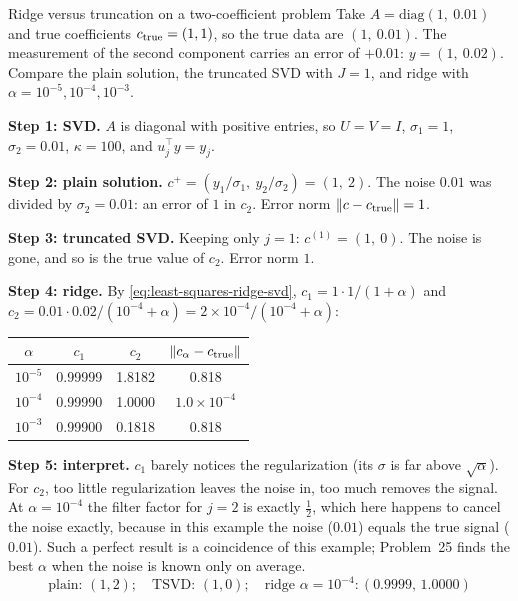 \begin{sample}{Ridge versus truncation on a two-coefficient problem}
Take $A = \mathrm{diag}(1,\ 0.01)$ and true coefficients $c_{\rm true} = (1,1)$, so the true data are $(1,\ 0.01)$. The measurement of the second component carries an error of $+0.01$: $y = (1,\ 0.02)$. Compare the plain solution, the truncated SVD with $J = 1$, and ridge with $\alpha = 10^{-5}, 10^{-4}, 10^{-3}$.

\textbf{Step 1: SVD.} $A$ is diagonal with positive entries, so $U = V = I$, $\sigma_1 = 1$, $\sigma_2 = 0.01$, $\kappa = 100$, and $u_j^\top y = y_j$.

\textbf{Step 2: plain solution.} $c^+ = (y_1/\sigma_1,\ y_2/\sigma_2) = (1,\ 2)$. The noise $0.01$ was divided by $\sigma_2 = 0.01$: an error of $1$ in $c_2$. Error norm $\left\lVert c - c_{\rm true}\right\rVert = 1$.

\textbf{Step 3: truncated SVD.} Keeping only $j=1$: $c^{(1)} = (1,\ 0)$. The noise is gone, and so is the true value of $c_2$. Error norm $1$.

\textbf{Step 4: ridge.} By \cref{eq:least-squares-ridge-svd}, $c_1 = 1\cdot1/(1+\alpha)$ and $c_2 = 0.01\cdot0.02/(10^{-4}+\alpha) = 2\times10^{-4}/(10^{-4}+\alpha)$:

\begin{center}
\begin{tabular}{cccc}\toprule
$\alpha$ & $c_1$ & $c_2$ & $\left\lVert c_\alpha - c_{\rm true}\right\rVert$\\\midrule
$10^{-5}$ & 0.99999 & 1.8182 & 0.818\\
$10^{-4}$ & 0.99990 & 1.0000 & $1.0\times10^{-4}$\\
$10^{-3}$ & 0.99900 & 0.1818 & 0.818\\\bottomrule
\end{tabular}
\end{center}

\textbf{Step 5: interpret.} $c_1$ barely notices the regularization (its $\sigma$ is far above $\sqrt\alpha$). For $c_2$, too little regularization leaves the noise in, too much removes the signal. At $\alpha = 10^{-4}$ the filter factor for $j=2$ is exactly $\frac12$, which here happens to cancel the noise exactly, because in this example the noise ($0.01$) equals the true signal ($0.01$). Such a perfect result is a coincidence of this example; Problem~25 finds the best $\alpha$ when the noise is known only on average.
\[
\boxed{\,\text{plain: }(1,2);\quad \text{TSVD: }(1,0);\quad \text{ridge }\alpha=10^{-4}: (0.9999,\,1.0000)\,}
\]
\end{sample}

